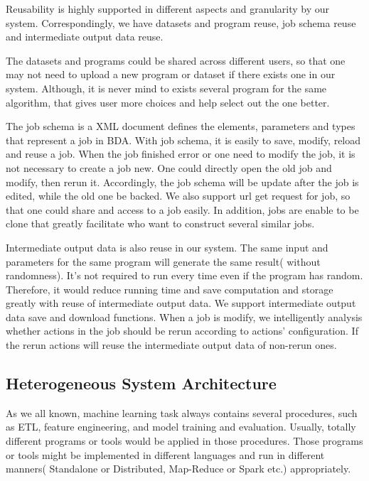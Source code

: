 \documentclass{sig-alternate-05-2015}
\begin{document}
Reusability is highly supported in different aspects and granularity by our system.  Correspondingly, we have datasets and program reuse, job schema reuse and intermediate output data reuse.

The datasets and programs could be shared across different users, so that one may not need to upload a new program or dataset if there exists one in our system. Although, it is never mind to exists several program for the same algorithm, that gives user more choices and help select out the one better. 

The job schema is a XML document defines the elements, parameters and types that represent a job in BDA. With job schema, it is easily to save, modify, reload and reuse a job. When the job finished error or one need to modify the job, it is not necessary to create a job new. One could directly open the old job and modify, then rerun it. Accordingly, the job schema will be update after the job is edited, while the old one be backed. We also support url get request for job, so that one could share and access to a job easily. In addition, jobs are enable to be clone that greatly facilitate who want to construct several similar jobs.

Intermediate output data is also reuse in our system. The same input and parameters for the same program will generate the same result( without randomness). It's not required to run every time even if the program has random. Therefore, it would reduce running time and save computation and storage greatly with reuse of intermediate output data. We support intermediate output data save and download functions. When a job is modify, we intelligently analysis whether actions in the job should be rerun according to actions' configuration. If the rerun actions will reuse the intermediate output data of non-rerun ones.


\subsection{Heterogeneous System Architecture}

As we all known, machine learning task always contains several procedures, such as ETL, feature engineering, and model training and evaluation. Usually, totally different programs or tools would be applied in those procedures. Those programs or tools might be implemented in different languages and run in different manners( Standalone or Distributed, Map-Reduce or Spark etc.) appropriately. 
\end{document}
